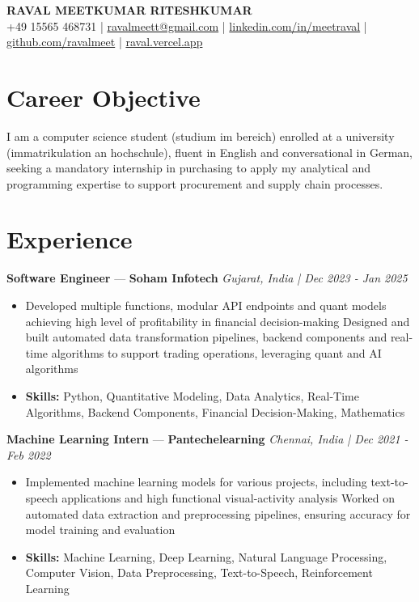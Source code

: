 \documentclass[a4paper,10pt]{article}
\begin{document}
\begin{center}
  {\Large\bfseries RAVAL MEETKUMAR RITESHKUMAR}\\[2pt]
  {\small +49 15565 468731 \;|\; \href{mailto:ravalmeett@gmail.com}{ravalmeett@gmail.com} \;|\; \href{https://www.linkedin.com/in/meetraval/}{linkedin.com/in/meetraval} \;|\; \href{https://github.com/ravalmeet}{github.com/ravalmeet} \;|\; \href{https://raval.vercel.app/}{raval.vercel.app}}
\end{center}
\vspace{-3pt}

\section*{Career Objective}
I am a computer science student (studium im bereich) enrolled at a university (immatrikulation an hochschule), fluent in English and conversational in German, seeking a mandatory internship in purchasing to apply my analytical and programming expertise to support procurement and supply chain processes.\par

\section*{Experience}
\textbf{Software Engineer} — \textbf{Soham Infotech} \hfill \textit{Gujarat, India \;|\; Dec 2023 - Jan 2025}\par
\vspace{1pt}
\begin{itemize}
  \item Developed multiple functions, modular API endpoints and quant models achieving high level of profitability in financial decision-making Designed and built automated data transformation pipelines, backend components and real-time algorithms to support trading operations, leveraging quant and AI algorithms
  \item \textbf{Skills:} Python, Quantitative Modeling, Data Analytics, Real-Time Algorithms, Backend Components, Financial Decision-Making, Mathematics
\end{itemize}
\vspace{3pt}
\textbf{Machine Learning Intern} — \textbf{Pantechelearning} \hfill \textit{Chennai, India \;|\; Dec 2021 - Feb 2022}\par
\vspace{1pt}
\begin{itemize}
  \item Implemented machine learning models for various projects, including text-to-speech applications and high functional visual-activity analysis Worked on automated data extraction and preprocessing pipelines, ensuring accuracy for model training and evaluation
  \item \textbf{Skills:} Machine Learning, Deep Learning, Natural Language Processing, Computer Vision, Data Preprocessing, Text-to-Speech, Reinforcement Learning
\end{itemize}
\end{document}
